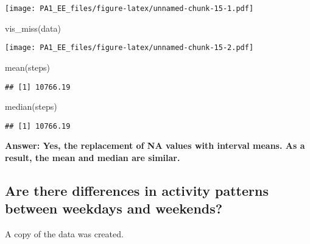 \documentclass[
]{article}
\newenvironment{Shaded}{\begin{snugshade}}{\end{snugshade}}
\newcommand{\AttributeTok}[1]{\textcolor[rgb]{0.77,0.63,0.00}{#1}}
\newcommand{\FunctionTok}[1]{\textcolor[rgb]{0.00,0.00,0.00}{#1}}
\newcommand{\NormalTok}[1]{#1}
\newcommand{\OtherTok}[1]{\textcolor[rgb]{0.56,0.35,0.01}{#1}}
\newcommand{\SpecialCharTok}[1]{\textcolor[rgb]{0.00,0.00,0.00}{#1}}
\begin{document}
\texttt{[image: PA1\_EE\_files/figure-latex/unnamed-chunk-15-1.pdf]}

\begin{Shaded}
\begin{Highlighting}[]
\FunctionTok{vis\_miss}\NormalTok{(data)}
\end{Highlighting}
\end{Shaded}

\texttt{[image: PA1\_EE\_files/figure-latex/unnamed-chunk-15-2.pdf]}

\begin{Shaded}
\begin{Highlighting}[]
\FunctionTok{mean}\NormalTok{(steps)}
\end{Highlighting}
\end{Shaded}

\begin{verbatim}
## [1] 10766.19
\end{verbatim}

\begin{Shaded}
\begin{Highlighting}[]
\FunctionTok{median}\NormalTok{(steps)}
\end{Highlighting}
\end{Shaded}

\begin{verbatim}
## [1] 10766.19
\end{verbatim}

\textbf{Answer: Yes, the replacement of NA values with interval means.
As a result, the mean and median are similar.}

\hypertarget{are-there-differences-in-activity-patterns-between-weekdays-and-weekends}{%
\subsection{Are there differences in activity patterns between weekdays
and
weekends?}\label{are-there-differences-in-activity-patterns-between-weekdays-and-weekends}}

A copy of the data was created.

\begin{Shaded}
\end{Shaded}
\end{document}
